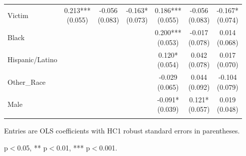 \begin{table}[!htbp]
\begin{threeparttable}
\begin{tabular}{lcccccc}
\addlinespace
Victim & \makecell[c]{0.213*** \\ (0.055)} & \makecell[c]{-0.056 \\ (0.083)} & \makecell[c]{-0.163* \\ (0.073)} & \makecell[c]{0.186*** \\ (0.055)} & \makecell[c]{-0.056 \\ (0.083)} & \makecell[c]{-0.167* \\ (0.074)} \\
Black &  &  &  & \makecell[c]{0.200*** \\ (0.053)} & \makecell[c]{-0.017 \\ (0.078)} & \makecell[c]{0.014 \\ (0.068)} \\
Hispanic/Latino &  &  &  & \makecell[c]{0.120* \\ (0.054)} & \makecell[c]{0.042 \\ (0.078)} & \makecell[c]{0.017 \\ (0.070)} \\
Other\_Race &  &  &  & \makecell[c]{-0.029 \\ (0.065)} & \makecell[c]{0.044 \\ (0.092)} & \makecell[c]{-0.104 \\ (0.079)} \\
Male &  &  &  & \makecell[c]{-0.091* \\ (0.039)} & \makecell[c]{0.121* \\ (0.057)} & \makecell[c]{0.019 \\ (0.048)} \\
\addlinespace
\bottomrule
\end{tabular}
\begin{tablenotes}[flushleft]
\footnotesize
\item Entries are OLS coefficients with HC1 robust standard errors in parentheses.
\item * p$<$0.05, ** p$<$0.01, *** p$<$0.001.
\end{tablenotes}
\end{threeparttable}
\end{table}
